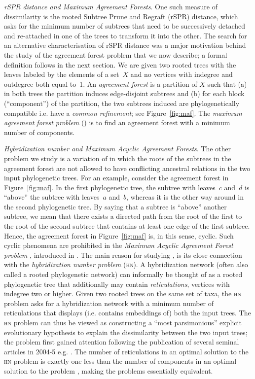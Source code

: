 \emph{rSPR distance and Maximum Agreement Forests}. One
such measure of dissimilarity is the rooted Subtree Prune and Regraft (rSPR) distance, which asks for the minimum number of subtrees that need to be successively detached and re-attached in one of the trees to transform it into the other. The search for an alternative characterisation of rSPR distance was a major motivation behind the study of the agreement forest problem that
we now describe; a formal definition follows in the next section. We are given two rooted trees with the leaves labeled by the elements of a set~$X$ and no vertices with indegree and outdegree both equal to~1. An \emph{agreement
forest} is a partition of $X$ such that (a) in both trees the partition induces edge-disjoint subtrees and (b) for each block (``component'') of the partition, the two subtrees induced are 
phylogenetically compatible i.e. have a \emph{common
refinement}; see Figure~\ref{fig:maf}. The {\em maximum agreement forest problem} (\maf) is to find an agreement forest with a minimum number of components.




\emph{Hybridization number and Maximum Acyclic Agreement Forests}. The other problem we study is a variation of \maf in which the roots of the subtrees in the agreement forest are not allowed to have conflicting ancestral relations in the two input phylogenetic trees. For an example, consider the agreement forest in Figure~\ref{fig:maf}. In the first phylogenetic tree, the subtree with leaves~$c$ and~$d$ is ``above'' the subtree with leaves~$a$ and~$b$, whereas it is the other way around in the second phylogenetic tree. By saying that a subtree is ``above'' another subtree, we mean that there exists a directed path from the root of the first to the root of the second subtree that contains at least one edge of the first subtree. Hence, the agreement forest in Figure~\ref{fig:maf} is, in this sense, cyclic. Such cyclic phenomena are prohibited in the {\em Maximum Acyclic Agreement Forest problem} \maaf, introduced in \cite{baroni05}. The main reason for studying \maaf, is its close connection with the \emph{
hybridization number problem} (\textsc{hn}). A hybridization network (often also called a rooted phylogenetic network) can informally be thought of as a rooted phylogenetic tree that additionally may contain \emph{reticulations}, vertices with indegree two or higher. Given two rooted trees on the same set of taxa, the \textsc{hn} problem asks for a hybridization network with a minimum number of reticulations that displays (i.e. contains embeddings of) both the input trees. The \textsc{hn} problem can thus be viewed as constructing a ``most parsimonious'' explicit evolutionary hypothesis to explain the dissimilarity between the two input trees; the problem first gained attention following the publication of several seminal articles in 2004-5 e.g. \cite{baroni05,BaroniEtAl2004}. The number of reticulations in an optimal solution to the \textsc{hn} problem is exactly one less than the number of components in an optimal solution to the \maaf problem \cite{baroni05}, making the problems essentially equivalent.

